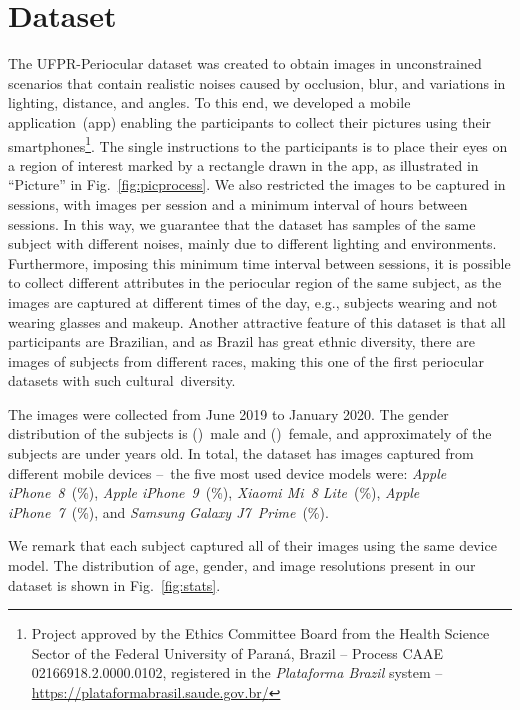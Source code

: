 \documentclass[journal]{IEEEtran}
\begin{document}
\section{Dataset}
\label{sec:database}

The UFPR-Periocular dataset was created to obtain images in unconstrained scenarios that contain realistic noises caused by occlusion, blur, and variations in lighting, distance, and angles.
To this end, we developed a mobile application~(app) enabling the participants to collect their pictures using their smartphones\footnote{Project approved by the Ethics Committee Board from the Health Science Sector of the Federal University of Paraná, Brazil -- Process CAAE 02166918.2.0000.0102, registered in the \textit{Plataforma Brazil} system -- \url{https://plataformabrasil.saude.gov.br/}}.
The single instructions to the participants is to place their eyes on a region of interest marked by a rectangle drawn in the app, as illustrated in ``Picture'' in Fig.~\ref{fig:picprocess}.
We also restricted the images to be captured in  sessions, with  images per session and a minimum interval of  hours between sessions.
In this way, we guarantee that the dataset has samples of the same subject with different noises, mainly due to different lighting and environments.
Furthermore, imposing this minimum time interval between sessions, it is possible to collect different attributes in the periocular region of the same subject, as the images are captured at different times of the day, e.g., subjects wearing and not wearing glasses and makeup.
Another attractive feature of this dataset is that all participants are Brazilian, and as Brazil has great ethnic diversity, there are images of subjects from different races, making this one of the first periocular datasets with such cultural~diversity.

The images were collected from June 2019 to January 2020.
The gender distribution of the subjects is ()~male and ()~female, and approximately  of the subjects are under  years old.
In total, the dataset has images captured from  different mobile devices --~the five most used device models were: \textit{Apple iPhone~8}~(\%), \textit{Apple iPhone~9}~(\%), \textit{Xiaomi Mi~8 Lite}~(\%), \textit{Apple iPhone~7}~(\%), and \textit{Samsung Galaxy J7~Prime}~(\%).

We remark that each subject captured all of their images using the same device model.
The distribution of age, gender, and image resolutions present in our dataset is shown in Fig.~\ref{fig:stats}.
\end{document}

